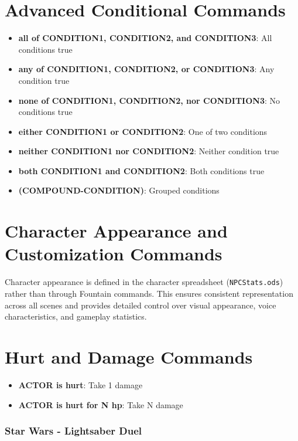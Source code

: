 \documentclass[11pt,letterpaper,oldstylefigures]{memoir}
\newcommand{\fountain}[1]{\textbf{#1}}
\begin{document}
\section{Advanced Conditional Commands}
\begin{itemize}
\item \fountain{all of CONDITION1, CONDITION2, and CONDITION3}: All conditions true
\item \fountain{any of CONDITION1, CONDITION2, or CONDITION3}: Any condition true
\item \fountain{none of CONDITION1, CONDITION2, nor CONDITION3}: No conditions true
\item \fountain{either CONDITION1 or CONDITION2}: One of two conditions
\item \fountain{neither CONDITION1 nor CONDITION2}: Neither condition true
\item \fountain{both CONDITION1 and CONDITION2}: Both conditions true
\item \fountain{(COMPOUND-CONDITION)}: Grouped conditions
\end{itemize}

\section{Character Appearance and Customization Commands}

Character appearance is defined in the character spreadsheet (\texttt{NPCStats.ods}) rather than through Fountain commands. This ensures consistent representation across all scenes and provides detailed control over visual appearance, voice characteristics, and gameplay statistics.



\section{Hurt and Damage Commands}
\begin{itemize}
\item \fountain{ACTOR is hurt}: Take 1 damage
\item \fountain{ACTOR is hurt for N hp}: Take N damage
\end{itemize}

\subsubsection*{Star Wars - Lightsaber Duel}
\label{ex:star-wars-lightsaber-duel}
\end{document}
